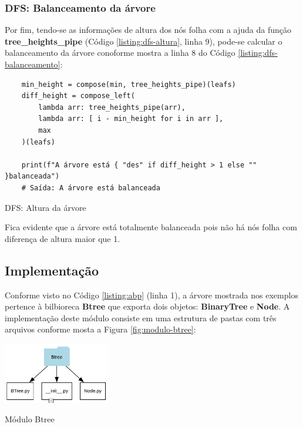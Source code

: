 \subsubsection{DFS: Balanceamento da árvore}

Por fim, tendo-se as informações de altura dos nós folha com a ajuda da função \textbf{tree\_heights\_pipe} (Código \ref{listing:dfs-altura}, linha 9),
pode-se calcular o balanceamento da árvore conoforme mostra a linha 8 do Código \ref{listing:dfs-balanceamento}:

\begin{listing}[H]
    \begin{verbatim}
    min_height = compose(min, tree_heights_pipe)(leafs)
    diff_height = compose_left(
        lambda arr: tree_heights_pipe(arr),
        lambda arr: [ i - min_height for i in arr ],
        max
    )(leafs)

    print(f"A árvore está { "des" if diff_height > 1 else "" }balanceada")
    # Saída: A árvore está balanceada
    \end{verbatim}
    \caption{DFS: Altura da árvore}
    \label{listing:dfs-balanceamento}
\end{listing}

Fica evidente que a árvore está totalmente balanceada pois não há nós folha com diferença de altura maior que 1.

\subsection{Implementação}
Conforme visto no Código \ref{listing:abp} (linha 1), a árvore mostrada nos exemplos pertence à bilbioreca \textbf{Btree}
que exporta dois objetos: \textbf{BinaryTree} e \textbf{Node}.\linebreak
A implementação deste módulo consiste em uma estrutura de pastas com três arquivos conforme mosta a Figura \ref{fig:modulo-btree}:

\begin{figlisting}[H]
    \centering
    \includegraphics[width=0.35\textwidth]{figs/btree_module.png} %
    \caption{Módulo Btree} %
    \label{fig:modulo-btree}
\end{figlisting}

